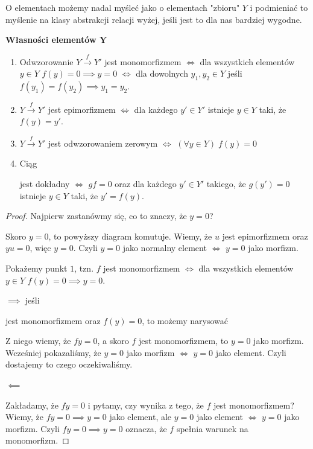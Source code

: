 O elementach możemy nadal myśleć jako o elementach "zbioru" $Y$ i podmieniać to myślenie na klasy abstrakcji relacji wyżej, jeśli jest to dla nas bardziej wygodne.

{\large\bfseries\color{green}Własności elementów $\mathbf{Y}$}

\begin{enumerate}
  \item Odwzorowanie $Y\xrightarrow{f}Y'$ jest monomorfizmem $\iff$ dla wszystkich elementów $y\in Y$ $f(y)=0\implies y=0$ $\iff$ dla dowolnych $y_1,y_2\in Y$ jeśli $f(y_1)=f(y_2)\implies y_1=y_2$.
  \item $Y\xrightarrow{f}Y'$ jest epimorfizmem $\iff$ dla każdego $y'\in Y'$ istnieje $y\in Y$ taki, że $f(y)=y'$.
  \item $Y\xrightarrow{f}Y'$ jest odwzorowaniem zerowym $\iff$ $(\forall y\in Y)\;f(y)=0$
  \item Ciąg  jest dokładny $\iff$ $gf=0$ oraz dla każdego $y'\in Y'$ takiego, że $g(y')=0$ istnieje $y\in Y$ taki, że $y'=f(y)$.
\end{enumerate}

\begin{proof}
  Najpierw zastanówmy się, co to znaczy, że $y=0$?
  \begin{center}\end{center}
  Skoro $y=0$, to powyższy diagram komutuje. Wiemy, że $u$ jest epimorfizmem oraz $yu=0$, więc $y=0$. Czyli $y=0$ jako normalny element $\iff$ $y=0$ jako morfizm.

  Pokażemy punkt $1$, tzn. $f$ jest monomorfizmem $\iff$ dla wszystkich elementów $y\in Y$ $f(y)=0\implies y=0$.

  $\implies$ jeśli  jest monomorfizmem oraz $f(y)=0$, to możemy narysować
  \begin{center}\end{center}
  Z niego wiemy, że $fy=0$, a skoro $f$ jest monomorfizmem, to $y=0$ jako morfizm. Wcześniej pokazaliśmy, że $y=0$ jako morfizm $\iff$ $y=0$ jako element. Czyli dostajemy to czego oczekiwaliśmy.

  $\impliedby$

  Zakładamy, że $fy=0$ i pytamy, czy wynika z tego, że $f$ jest monomorfizmem? Wiemy, że $fy=0\implies y=0$ jako element, ale $y=0$ jako element $\iff$ $y=0$ jako morfizm. Czyli $fy=0\implies y=0$ oznacza, że $f$ spełnia warunek na monomorfizm. 
\end{proof}

